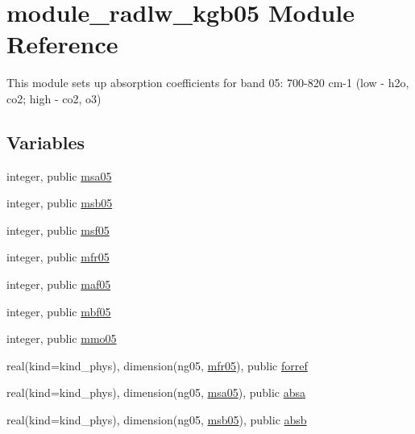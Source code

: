 \hypertarget{namespacemodule__radlw__kgb05}{}\section{module\+\_\+radlw\+\_\+kgb05 Module Reference}
\label{namespacemodule__radlw__kgb05}


This module sets up absorption coefficients for band 05\+: 700-\/820 cm-\/1 (low -\/ h2o, co2; high -\/ co2, o3)  


\subsection*{Variables}
\begin{DoxyCompactItemize}
\item 
integer, public \hyperlink{namespacemodule__radlw__kgb05_a79c5177c6d0e56a69f4d1a0704879539}{msa05}
\item 
integer, public \hyperlink{namespacemodule__radlw__kgb05_a0f3b6573bfe94c5a5968cda2dc8b1adf}{msb05}
\item 
integer, public \hyperlink{namespacemodule__radlw__kgb05_a1c9a43b7011e7328fa62d3ecd29acc73}{msf05}
\item 
integer, public \hyperlink{namespacemodule__radlw__kgb05_a44f07da9a7f99377f7d331249c475b80}{mfr05}
\item 
integer, public \hyperlink{namespacemodule__radlw__kgb05_aba904215976d7f4316b52c8f0cffe595}{maf05}
\item 
integer, public \hyperlink{namespacemodule__radlw__kgb05_a57db9a9cb9acac604df555038f6127a3}{mbf05}
\item 
integer, public \hyperlink{namespacemodule__radlw__kgb05_aa552aae4878030144218ca6c2bbe417f}{mmo05}
\item 
real(kind=kind\+\_\+phys), dimension(ng05, \hyperlink{namespacemodule__radlw__kgb05_a44f07da9a7f99377f7d331249c475b80}{mfr05}), public \hyperlink{namespacemodule__radlw__kgb05_a6ff0c311db14b41c9bdf1170164adc3a}{forref}
\item 
real(kind=kind\+\_\+phys), dimension(ng05, \hyperlink{namespacemodule__radlw__kgb05_a79c5177c6d0e56a69f4d1a0704879539}{msa05}), public \hyperlink{namespacemodule__radlw__kgb05_a30ce809b40dd99b3219996ac8f023274}{absa}
\item 
real(kind=kind\+\_\+phys), dimension(ng05, \hyperlink{namespacemodule__radlw__kgb05_a0f3b6573bfe94c5a5968cda2dc8b1adf}{msb05}), public \hyperlink{namespacemodule__radlw__kgb05_aebc667b0569824bba455e822eaea6112}{absb}

\end{DoxyCompactItemize}

